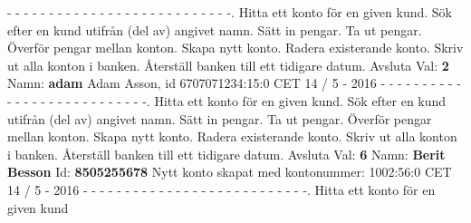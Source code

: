 \begin{multicols}{2}
- - - - - - - - - - - - - - - - - - - - - - - - - - -.   Hitta ett konto för en given kund.   Sök efter en kund utifrån (del av) angivet namn.   Sätt in pengar.   Ta ut pengar.   Överför pengar mellan konton.   Skapa nytt konto.   Radera existerande konto.   Skriv ut alla konton i banken.   Återställ banken till ett tidigare datum. Avsluta\newline
Val: \textbf{2}\newline
Namn: \textbf{adam}\newline
Adam Asson, id 6707071234:15:0 CET 14 / 5 - 2016\newline
- - - - - - - - - - - - - - - - - - - - - - - - - - -.   Hitta ett konto för en given kund.   Sök efter en kund utifrån (del av) angivet namn.   Sätt in pengar.   Ta ut pengar.   Överför pengar mellan konton.   Skapa nytt konto.   Radera existerande konto.   Skriv ut alla konton i banken.   Återställ banken till ett tidigare datum. Avsluta\newline
Val: \textbf{6}\newline
Namn: \textbf{Berit Besson}\newline
Id: \textbf{8505255678}\newline
Nytt konto skapat med kontonummer: 1002:56:0 CET 14 / 5 - 2016\newline
- - - - - - - - - - - - - - - - - - - - - - - - - - -.   Hitta ett konto för en given kund\newline

\end{multicols}
